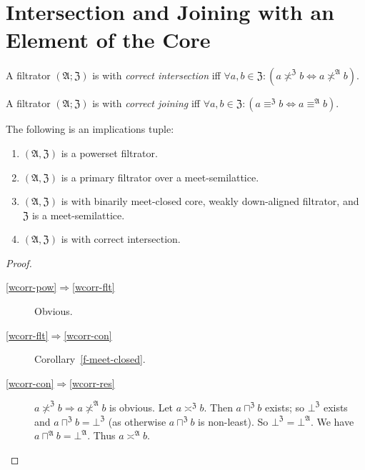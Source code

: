 \section{Intersection and Joining with an Element of the Core}

\begin{defn}
  A filtrator $(\mathfrak{A}; \mathfrak{Z})$ is with \emph{correct
  intersection} iff $\forall a, b \in \mathfrak{Z}: (a \nasymp^{\mathfrak{Z}}
  b \Leftrightarrow a \nasymp^{\mathfrak{A}} b)$.
\end{defn}

\begin{defn}
  A filtrator $(\mathfrak{A}; \mathfrak{Z})$ is with \emph{correct
  joining} iff $\forall a, b \in \mathfrak{Z}: (a \equiv^{\mathfrak{Z}}
  b \Leftrightarrow a \equiv^{\mathfrak{A}} b)$.
\end{defn}

\begin{prop}\label{is-corr-inters}
The following is an implications tuple:
\begin{enumerate}
 \item\label{wcorr-pow} $(\mathfrak{A},\mathfrak{Z})$ is a powerset filtrator.
 \item\label{wcorr-flt}  $(\mathfrak{A},\mathfrak{Z})$ is a primary filtrator over
   a meet-semilattice.
 \item\label{wcorr-con} $(\mathfrak{A},\mathfrak{Z})$ is with binarily meet-closed core,
   weakly down-aligned filtrator, and~$\mathfrak{Z}$ is a meet-semilattice.
 \item\label{wcorr-res} $(\mathfrak{A},\mathfrak{Z})$ is with correct intersection.
\end{enumerate}
\end{prop}

\begin{proof}
~
\begin{description}
 \item[\ref{wcorr-pow}$\Rightarrow$\ref{wcorr-flt}] Obvious.
 \item[\ref{wcorr-flt}$\Rightarrow$\ref{wcorr-con}]
  Corollary~\ref{f-meet-closed}.
 \item[\ref{wcorr-con}$\Rightarrow$\ref{wcorr-res}]
  $a \nasymp^{\mathfrak{Z}} b \Rightarrow a \nasymp^{\mathfrak{A}} b$ is
  obvious. Let $a \asymp^{\mathfrak{Z}} b$. Then $a \sqcap^{\mathfrak{Z}} b$
  exists; so $\bot^{\mathfrak{Z}}$ exists and $a \sqcap^{\mathfrak{Z}} b =
  \bot^{\mathfrak{Z}}$ (as otherwise $a \sqcap^{\mathfrak{Z}} b$ is
  non-least). So $\bot^{\mathfrak{Z}} = \bot^{\mathfrak{A}}$. We have $a
  \sqcap^{\mathfrak{A}} b = \bot^{\mathfrak{A}}$. Thus $a
  \asymp^{\mathfrak{A}} b$.
\end{description}
\end{proof}

